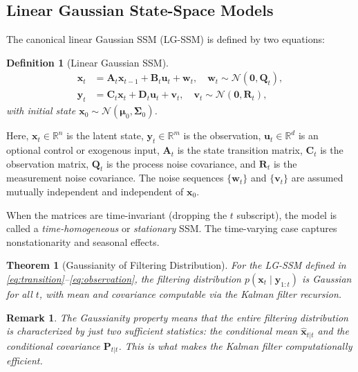 \documentclass[conference]{IEEEtran}
\newtheorem{definition}{Definition}
\newtheorem{theorem}{Theorem}
\newtheorem{remark}{Remark}
\begin{document}
\subsection{Linear Gaussian State-Space Models}

The canonical linear Gaussian SSM (LG-SSM) is defined by two equations:

\begin{definition}[Linear Gaussian SSM]
\begin{align}
\mathbf{x}_t &= \mathbf{A}_t \mathbf{x}_{t-1} + \mathbf{B}_t \mathbf{u}_t + \mathbf{w}_t, \quad \mathbf{w}_t \sim \mathcal{N}(\mathbf{0}, \mathbf{Q}_t), \label{eq:transition}\\
\mathbf{y}_t &= \mathbf{C}_t \mathbf{x}_t + \mathbf{D}_t \mathbf{u}_t + \mathbf{v}_t, \quad \mathbf{v}_t \sim \mathcal{N}(\mathbf{0}, \mathbf{R}_t), \label{eq:observation}
\end{align}
with initial state $\mathbf{x}_0 \sim \mathcal{N}(\boldsymbol{\mu}_0, \boldsymbol{\Sigma}_0)$.
\end{definition}

Here, $\mathbf{x}_t \in \mathbb{R}^n$ is the latent state, $\mathbf{y}_t \in \mathbb{R}^m$ is the observation, $\mathbf{u}_t \in \mathbb{R}^d$ is an optional control or exogenous input, $\mathbf{A}_t$ is the state transition matrix, $\mathbf{C}_t$ is the observation matrix, $\mathbf{Q}_t$ is the process noise covariance, and $\mathbf{R}_t$ is the measurement noise covariance. The noise sequences $\{\mathbf{w}_t\}$ and $\{\mathbf{v}_t\}$ are assumed mutually independent and independent of $\mathbf{x}_0$.

When the matrices are time-invariant (dropping the $t$ subscript), the model is called a \emph{time-homogeneous} or \emph{stationary} SSM. The time-varying case captures nonstationarity and seasonal effects.

\begin{theorem}[Gaussianity of Filtering Distribution]
For the LG-SSM defined in \eqref{eq:transition}--\eqref{eq:observation}, the filtering distribution $p(\mathbf{x}_t \mid \mathbf{y}_{1:t})$ is Gaussian for all $t$, with mean and covariance computable via the Kalman filter recursion.
\end{theorem}

\begin{remark}
The Gaussianity property means that the entire filtering distribution is characterized by just two sufficient statistics: the conditional mean $\hat{\mathbf{x}}_{t|t}$ and the conditional covariance $\mathbf{P}_{t|t}$. This is what makes the Kalman filter computationally efficient.
\end{remark}
\end{document}
